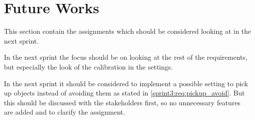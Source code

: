 \section{Future Works}
This section contain the assignments which should be considered looking at in the next sprint.

In the next sprint the focus should be on looking at the rest of the requirements, but especially the look of the calibration in the settings.

In the next sprint it should be considered to implement a possible setting to pick up objects instead of avoiding them as stated in \cref{sprint3:req:pickup_avoid}.
But this should be discussed with the stakeholders first, so no unnecessary features are added and to clarify the assignment.